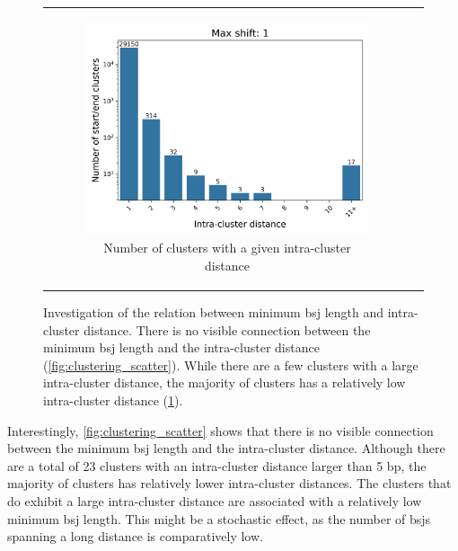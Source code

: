 \begin{figure}[H]
\begin{tabular}{cc}
\begin{subfigure}{0.5\textwidth}
                       \includegraphics[width=\linewidth]{chapters/4_results_and_discussion/figures/detection/distances/diff_1_bar.png}
                       \caption{Number of clusters with a given intra-cluster
                           distance}
                       \label{fig:clustering_bar} \end{subfigure}\end{tabular}
    \caption{Investigation of the relation between minimum \gls{bsj} length and
        intra-cluster distance.
        There is no visible connection between the minimum \gls{bsj} length and the
        intra-cluster distance (\cref{fig:clustering_scatter}).
        While there are a few clusters with a large intra-cluster distance, the
        majority of clusters has a relatively low intra-cluster distance
        (\cref{fig:clustering_bar}).
    }
    \label{fig:clustering}
\end{figure}

Interestingly, \cref{fig:clustering_scatter} shows that there is no visible
connection between the minimum \gls{bsj} length and the intra-cluster distance.
Although there are a total of 23 clusters with an intra-cluster distance larger
than 5 bp, the majority of clusters has relatively lower intra-cluster
distances.
The clusters that do exhibit a large intra-cluster distance are associated with
a relatively low minimum \gls{bsj} length.
This might be a stochastic effect, as the number of \gls{bsj}s spanning a long
distance is comparatively low.

